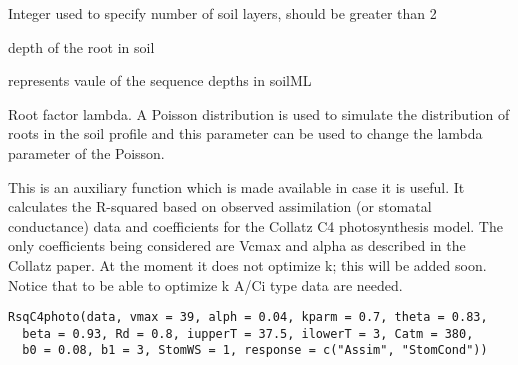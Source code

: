 \documentclass[letterpaper]{book}
\begin{document}
%
\begin{Arguments}
\begin{ldescription}
\item[\code{layers}] Integer used to specify number of soil
layers, should be greater than 2

\item[\code{rootDepth}] depth of the root in soil

\item[\code{depthsp}] represents vaule of the sequence depths in
soilML

\item[\code{rfl}] Root factor lambda. A Poisson distribution is
used to simulate the distribution of roots in the soil
profile and this parameter can be used to change the
lambda parameter of the Poisson.
\end{ldescription}
\end{Arguments}
%
\begin{Description}\relax
This is an auxiliary function which is made available in
case it is useful. It calculates the R-squared based on
observed assimilation (or stomatal conductance) data and
coefficients for the Collatz C4 photosynthesis model. The
only coefficients being considered are Vcmax and alpha as
described in the Collatz paper. At the moment it does not
optimize k; this will be added soon.  Notice that to be
able to optimize k A/Ci type data are needed.
\end{Description}
%
\begin{Usage}
\begin{verbatim}
RsqC4photo(data, vmax = 39, alph = 0.04, kparm = 0.7, theta = 0.83,
  beta = 0.93, Rd = 0.8, iupperT = 37.5, ilowerT = 3, Catm = 380,
  b0 = 0.08, b1 = 3, StomWS = 1, response = c("Assim", "StomCond"))
\end{verbatim}
\end{Usage}
%
\end{document}
